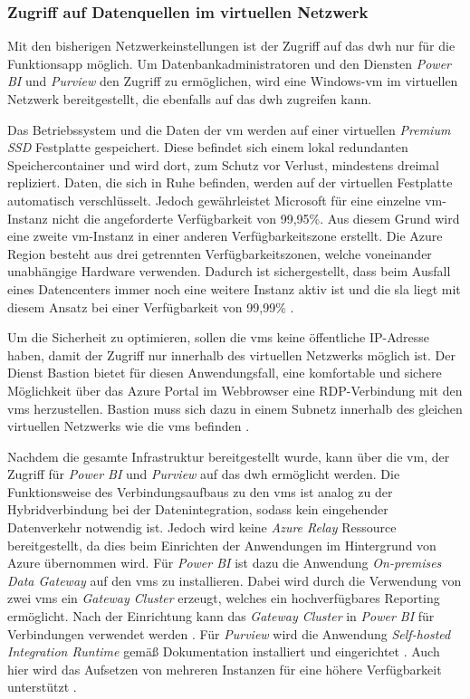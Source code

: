 \subsubsection{Zugriff auf Datenquellen im virtuellen Netzwerk} \label{subsec:infra:konfig:vm}
Mit den bisherigen Netzwerkeinstellungen ist der Zugriff auf das \ac{dwh} nur für die Funktionsapp möglich. Um Datenbankadministratoren und den Diensten \textit{Power BI} und \textit{Purview} den Zugriff zu ermöglichen, wird eine Windows-\ac{vm} im virtuellen Netzwerk bereitgestellt, die ebenfalls auf das \ac{dwh} zugreifen kann.

Das Betriebssystem und die Daten der \ac{vm} werden auf einer virtuellen \textit{Premium SSD} Festplatte gespeichert. Diese befindet sich einem lokal redundanten Speichercontainer und wird dort, zum Schutz vor Verlust, mindestens dreimal repliziert. Daten, die sich in Ruhe befinden, werden auf der virtuellen Festplatte automatisch verschlüsselt. Jedoch gewährleistet Microsoft für eine einzelne \ac{vm}-Instanz nicht die angeforderte Verfügbarkeit von 99,95\%. Aus diesem Grund wird eine zweite \ac{vm}-Instanz in einer anderen Verfügbarkeitszone erstellt. Die Azure Region besteht aus drei getrennten Verfügbarkeitszonen, welche voneinander unabhängige Hardware verwenden. Dadurch ist sichergestellt, dass beim Ausfall eines Datencenters immer noch eine weitere Instanz aktiv ist und die \ac{sla} liegt mit diesem Ansatz bei einer Verfügbarkeit von 99,99\% \cite[vgl.][]{soh_data_2020}.

Um die Sicherheit zu optimieren, sollen die \acp{vm} keine öffentliche IP-Adresse haben, damit der Zugriff nur innerhalb des virtuellen Netzwerks möglich ist. Der Dienst Bastion bietet für diesen Anwendungsfall, eine komfortable und sichere Möglichkeit über das Azure Portal im Webbrowser eine RDP-Verbindung mit den \acp{vm} herzustellen. Bastion muss sich dazu in einem Subnetz innerhalb des gleichen virtuellen Netzwerks wie die \acp{vm} befinden \cite[vgl.][]{herath_azure_2022}.

Nachdem die gesamte Infrastruktur bereitgestellt wurde, kann über die \ac{vm}, der Zugriff für \textit{Power BI} und \textit{Purview} auf das \ac{dwh} ermöglicht werden. Die Funktionsweise des Verbindungsaufbaus zu den \acp{vm} ist analog zu der Hybridverbindung bei der Datenintegration, sodass kein eingehender Datenverkehr notwendig ist. Jedoch wird keine \textit{Azure Relay} Ressource bereitgestellt, da dies beim Einrichten der Anwendungen im Hintergrund von Azure übernommen wird. Für \textit{Power BI} ist dazu die Anwendung \textit{On-premises Data Gateway} auf den \acp{vm} zu installieren. Dabei wird durch die Verwendung von zwei \acp{vm} ein \textit{Gateway Cluster} erzeugt, welches ein hochverfügbares Reporting ermöglicht. Nach der Einrichtung kann das \textit{Gateway Cluster} in \textit{Power BI} für Verbindungen verwendet werden \cite[vgl.][]{gunnarsson_pro_2020}. Für \textit{Purview} wird die Anwendung \textit{Self-hosted Integration Runtime} gemäß Dokumentation installiert und eingerichtet \cite[vgl.][]{msdoc_22_purviewSHIR}. Auch hier wird das Aufsetzen von mehreren Instanzen für eine höhere Verfügbarkeit unterstützt \cite{msdoc_22_purviewSHIRHighAv}.

